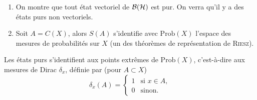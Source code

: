 \begin{exs}
  \begin{enumerate}
  \item On montre que tout état vectoriel de $\mathcal{B}(\mathcal{H})$ est pur. On verra qu'il y a des états purs non vectoriels.
  \item Soit $A = C(X)$, alors $S(A)$ s'identifie avec $\mathrm{Prob}(X)$ l'espace des mesures de probabilités
    sur $X$ (un des théorèmes de représentation de \textsc{Riesz}). \qedhere
  \end{enumerate}
\end{exs}

Les états purs s'identifient aux points extrêmes de $\mathrm{Prob}(X)$, c'est-à-dire aux mesures de Dirac
$\delta_x$, définie par (pour $A \subset X$)
\[ \delta_x(A) =
  \begin{cases}
    1 & \text{si } x \in A,\\
    0 & \text{sinon.}
  \end{cases}
\]








